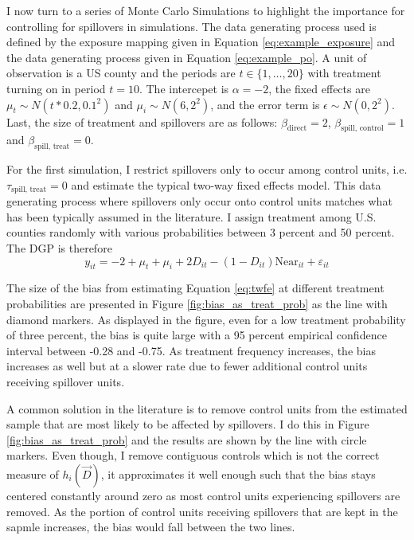 \documentclass[11pt]{article}
\begin{document}
I now turn to a series of Monte Carlo Simulations to highlight the importance for controlling for spillovers in simulations. The data generating process used is defined by the exposure mapping given in Equation \ref{eq:example_exposure} and the data generating process given in Equation \ref{eq:example_po}. A unit of observation is a US county and the periods are $t \in \{1, \dots, 20\}$ with treatment turning on in period $t = 10$. The intercepet is $\alpha = -2$, the fixed effects are $\mu_t \sim N(t * 0.2, 0.1^2)$ and $\mu_i \sim N(6, 2^2)$, and the error term is $\epsilon \sim N(0, 2^2)$. Last, the size of treatment and spillovers are as follows: $\beta_{\text{direct}} = 2$, $\beta_{\text{spill, control}} = 1$ and $\beta_{\text{spill, treat}} = 0$.

For the first simulation, I restrict spillovers only to occur among control units, i.e. $\tau_{\text{spill, treat}} = 0$ and estimate the typical two-way fixed effects model. This data generating process where spillovers only occur onto control units matches what has been typically assumed in the literature. I assign treatment among U.S. counties randomly with various probabilities between 3 percent and 50 percent. The DGP is therefore 
\begin{equation}
    \label{dgp1} 
    y_{it} = -2 + \mu_t + \mu_i + 2 D_{it} - (1-D_{it}) \text{Near}_{it} + \varepsilon_{it}   
\end{equation}

The size of the bias from estimating Equation \ref{eq:twfe} at different treatment probabilities are presented in Figure \ref{fig:bias_as_treat_prob} as the line with diamond markers. As displayed in the figure, even for a low treatment probability of three percent, the bias is quite large with a 95 percent empirical confidence interval between -0.28 and -0.75. As treatment frequency increases, the bias increases as well but at a slower rate due to fewer additional control units receiving spillover units. 

A common solution in the literature is to remove control units from the estimated sample that are most likely to be affected by spillovers. I do this in Figure \ref{fig:bias_as_treat_prob} and the results are shown by the line with circle markers. Even though, I remove contiguous controls which is not the correct measure of $h_i(\vec{D})$, it approximates it well enough such that the bias stays centered constantly around zero as most control units experiencing spillovers are removed. As the portion of control units receiving spillovers that are kept in the sapmle increases, the bias would fall between the two lines.
\end{document}
